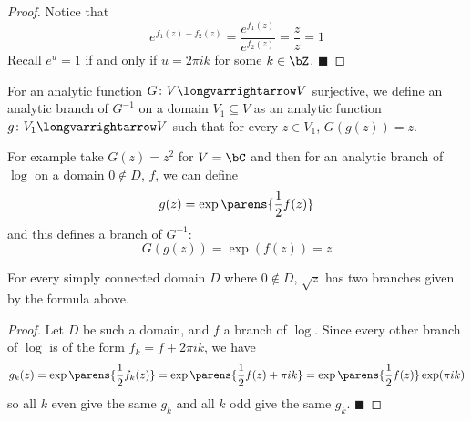 \documentclass[10pt]{article}
\let\longto=\longvarrightarrow
\def\qed{\hskip1cm\hbox{}\hfill$\blacksquare$}
\begin{document}
\begin{proof}

    Notice that
    \[ e^{f_1(z)-f_2(z)} = \frac{e^{f_1(z)}}{e^{f_2(z)}} = \frac zz = 1 \]
    Recall $e^u=1$ if and only if $u=2\pi ik$ for some $k\in\bZ$.
    \qed

\end{proof}

\begin{defn*}

    For an analytic function $G\colon V\longto V$ surjective, we define an analytic branch of $G^{-1}$ on a domain $V_1\subseteq V$ as an analytic function $g\colon V_1\longto V$ such that for every
    $z\in V_1$, $G(g(z))=z$.

\end{defn*}

For example take $G(z)=z^2$ for $V=\bC$ and then for an analytic branch of $\log$ on a domain $0\notin D$, $f$, we can define
\[ g(z) = \exp\parens{\frac12 f(z)} \]
and this defines a branch of $G^{-1}$:
\[ G(g(z)) = \exp(f(z)) = z \]

\begin{prop*}

    For every simply connected domain $D$ where $0\notin D$, $\sqrt z$ has two branches given by the formula above.

\end{prop*}

\begin{proof}

    Let $D$ be such a domain, and $f$ a branch of $\log$.
    Since every other branch of $\log$ is of the form $f_k=f+2\pi ik$, we have
    \[ g_k(z) = \exp\parens{\frac12 f_k(z)} = \exp\parens{\frac12f(z)+\pi ik} = \exp\parens{\frac12f(z)}\exp(\pi ik) \]
    so all $k$ even give the same $g_k$ and all $k$ odd give the same $g_k$.
    \qed

\end{proof}
\end{document}
